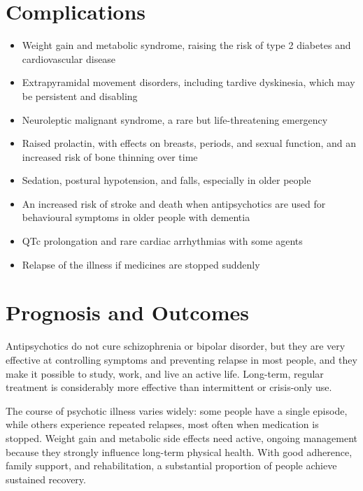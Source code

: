 \section*{Complications}
\begin{itemize}
    \item Weight gain and metabolic syndrome, raising the risk of type 2 diabetes and cardiovascular disease
    \item Extrapyramidal movement disorders, including tardive dyskinesia, which may be persistent and disabling
    \item Neuroleptic malignant syndrome, a rare but life-threatening emergency
    \item Raised prolactin, with effects on breasts, periods, and sexual function, and an increased risk of bone thinning over time
    \item Sedation, postural hypotension, and falls, especially in older people
    \item An increased risk of stroke and death when antipsychotics are used for behavioural symptoms in older people with dementia
    \item QTc prolongation and rare cardiac arrhythmias with some agents
    \item Relapse of the illness if medicines are stopped suddenly
\end{itemize}

\section*{Prognosis and Outcomes}
Antipsychotics do not cure schizophrenia or bipolar disorder, but they are very effective at controlling symptoms and preventing relapse in most people, and they make it possible to study, work, and live an active life. Long-term, regular treatment is considerably more effective than intermittent or crisis-only use.

The course of psychotic illness varies widely: some people have a single episode, while others experience repeated relapses, most often when medication is stopped. Weight gain and metabolic side effects need active, ongoing management because they strongly influence long-term physical health. With good adherence, family support, and rehabilitation, a substantial proportion of people achieve sustained recovery.

